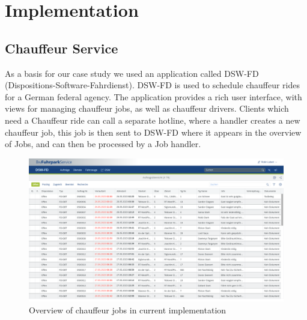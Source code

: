 \chapter{Implementation}
\label{ch:implementation}

\section{Chauffeur Service}


As a basis for our case study we used an application called DSW-FD (Dispositions-Software-Fahrdienst). DSW-FD is used to schedule chauffeur rides for a German federal agency. The application provides a rich user interface, with views for managing chauffeur jobs, as well as chauffeur drivers. Clients which need a Chauffeur ride can call a separate hotline, where a handler creates a new chauffeur job, this job is then sent to DSW-FD where it appears in the overview of Jobs, and can then be processed by a Job handler.


\begin{figure}
    \centering
    \includegraphics[width=\linewidth]{assets/current-auftrag-overview}
    \caption{Overview of chauffeur jobs in current implementation}
    \label{fig:current-overview-auftrag}
\end{figure}


